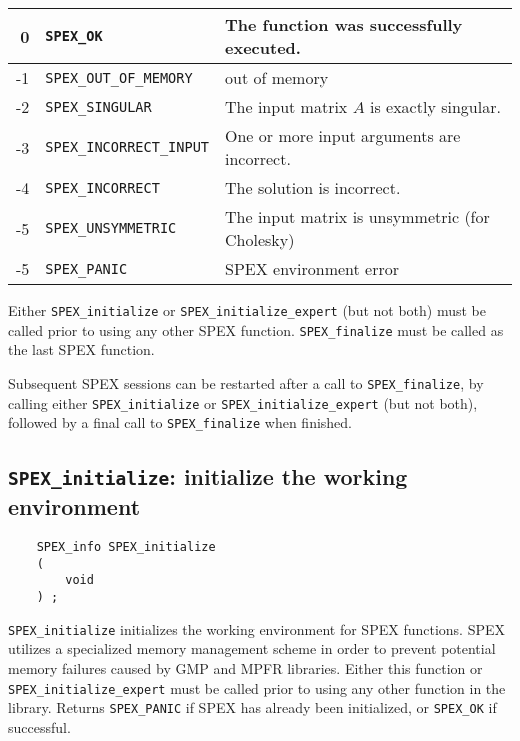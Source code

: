 \documentclass[12pt]{report}
\theoremstyle{definition}
\begin{document}
\begin{center}
\begin{tabular}{rll}
\hline
    0& \verb|SPEX_OK|& The function was successfully executed.\\
\hline
    -1& \verb|SPEX_OUT_OF_MEMORY|& out of memory\\
\hline
    -2& \verb|SPEX_SINGULAR|& The input matrix $A$ is exactly singular.\\
\hline
    -3& \verb|SPEX_INCORRECT_INPUT|& One or more input arguments are incorrect.\\
\hline
    -4& \verb|SPEX_INCORRECT|& The solution is incorrect.\\
\hline
    -5& \verb|SPEX_UNSYMMETRIC|& The input matrix is unsymmetric (for Cholesky)\\
\hline
    -5& \verb|SPEX_PANIC| & SPEX environment error \\
\hline
\end{tabular}
\end{center}

Either \verb|SPEX_initialize| or \verb|SPEX_initialize_expert| (but not both)
must be called prior to using any other SPEX function.  \verb|SPEX_finalize|
must be called as the last SPEX function.

Subsequent SPEX sessions can be restarted after a call to
\verb|SPEX_finalize|, by calling either \verb|SPEX_initialize| or
\verb|SPEX_initialize_expert| (but not both), followed by a final call to
\verb|SPEX_finalize| when finished.

\newpage
\cprotect\subsection{\verb|SPEX_initialize|: initialize the working environment}

\begin{mdframed}[userdefinedwidth=6in]
{\footnotesize
\begin{verbatim}
    SPEX_info SPEX_initialize
    (
        void
    ) ;
\end{verbatim}
} \end{mdframed}

\verb|SPEX_initialize| initializes the working environment for SPEX
functions.  SPEX utilizes a specialized memory management scheme in order to
prevent potential memory failures caused by GMP and MPFR libraries.  Either
this function or \verb|SPEX_initialize_expert| must be called prior to using
any other function in the library.  Returns \verb|SPEX_PANIC| if SPEX has
already been initialized, or \verb|SPEX_OK| if successful.
\end{document}
